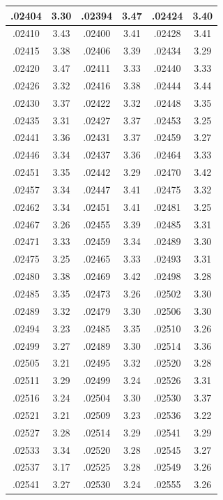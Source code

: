 \documentclass[10pt,twoside]{report}
\begin{document}
\begin{appendices}
\begin{longtable}{|c|c||c|c||c|c|}
.02404 & 3.30 & .02394 & 3.47 & .02424 & 3.40\\\hline
.02410 & 3.43 & .02400 & 3.41 & .02428 & 3.41\\\hline
.02415 & 3.38 & .02406 & 3.39 & .02434 & 3.29\\\hline
.02420 & 3.47 & .02411 & 3.33 & .02440 & 3.33\\\hline
.02426 & 3.32 & .02416 & 3.38 & .02444 & 3.44\\\hline
.02430 & 3.37 & .02422 & 3.32 & .02448 & 3.35\\\hline
.02435 & 3.31 & .02427 & 3.37 & .02453 & 3.25\\\hline
.02441 & 3.36 & .02431 & 3.37 & .02459 & 3.27\\\hline
.02446 & 3.34 & .02437 & 3.36 & .02464 & 3.33\\\hline
.02451 & 3.35 & .02442 & 3.29 & .02470 & 3.42\\\hline
.02457 & 3.34 & .02447 & 3.41 & .02475 & 3.32\\\hline
.02462 & 3.34 & .02451 & 3.41 & .02481 & 3.25\\\hline
.02467 & 3.26 & .02455 & 3.39 & .02485 & 3.31\\\hline
.02471 & 3.33 & .02459 & 3.34 & .02489 & 3.30\\\hline
.02475 & 3.25 & .02465 & 3.33 & .02493 & 3.31\\\hline
.02480 & 3.38 & .02469 & 3.42 & .02498 & 3.28\\\hline
.02485 & 3.35 & .02473 & 3.26 & .02502 & 3.30\\\hline
.02489 & 3.32 & .02479 & 3.30 & .02506 & 3.30\\\hline
.02494 & 3.23 & .02485 & 3.35 & .02510 & 3.26\\\hline
.02499 & 3.27 & .02489 & 3.30 & .02514 & 3.36\\\hline
.02505 & 3.21 & .02495 & 3.32 & .02520 & 3.28\\\hline
.02511 & 3.29 & .02499 & 3.24 & .02526 & 3.31\\\hline
.02516 & 3.24 & .02504 & 3.30 & .02530 & 3.37\\\hline
.02521 & 3.21 & .02509 & 3.23 & .02536 & 3.22\\\hline
.02527 & 3.28 & .02514 & 3.29 & .02541 & 3.29\\\hline
.02533 & 3.34 & .02520 & 3.28 & .02545 & 3.27\\\hline
.02537 & 3.17 & .02525 & 3.28 & .02549 & 3.26\\\hline
.02541 & 3.27 & .02530 & 3.24 & .02555 & 3.26\\\hline

\end{longtable}
\end{appendices}
\end{document}
